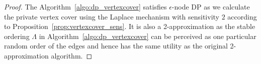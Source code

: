 \begin{proof}
The Algorithm~\ref{algo:dp_vertexcover} satisfies $\epsilon$-node DP as we calculate the private vertex cover using the Laplace mechanism with sensitivity $2$ according to Proposition~\ref{prop:vertexcover_sens}. It is also a 2-approximation as the stable ordering $\Lambda$ in Algorithm~\ref{algo:dp_vertexcover} can be perceived as one particular random order of the edges and hence has the same utility as the original 2-approximation algorithm. 
\end{proof}
